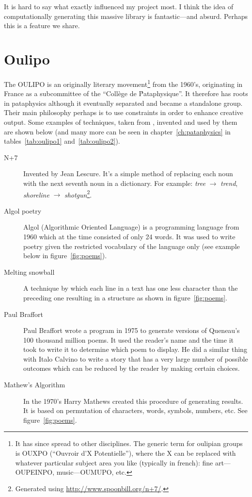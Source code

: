 It is hard to say what exactly influenced my project most. I think the idea of computationally generating this massive library is fantastic---and absurd. Perhaps this is a feature we share.


\section{Oulipo}
\label{s:oulipo}


The \ac{OULIPO} is an originally literary movement\footnote{It has since spread to other disciplines. The generic term for oulipian groups is OUXPO (``Ouvroir d'X Potentielle''), where the X can be replaced with whatever particular subject area you like (typically in french): fine art---OUPEINPO, music---OUMUPO, etc.} from the 1960's, originating in France as a subcommittee of the ``Coll\`{e}ge de \'Pataphysique''. It therefore has roots in pataphysics although it eventually separated and became a standalone group. Their main philosophy perhaps is to use constraints in order to enhance creative output. Some examples of techniques, taken from \autocite{Mathews2005}, invented and used by them are shown below (and many more can be seen in chapter~\ref{ch:pataphysics} in tables~\ref{tab:oulipo1} and~\ref{tab:oulipo2}).

\begin{description}
  \item[N+7] Invented by Jean Lescure. It's a simple method of replacing each noun with the next seventh noun in a dictionary. For example: \textit{tree} $\rightarrow$ \textit{trend}, \textit{shoreline} $\rightarrow$ \textit{shotgun}\footnote{Generated using \url{http://www.spoonbill.org/n+7/}.}.
  \item[Algol poetry] Algol (Algorithmic Oriented Language) is a programming language from 1960 which at the time consisted of only \num{24} words. It was used to write poetry given the restricted vocabulary of the language only (see example below in figure~\ref{fig:poems}).
  \item[Melting snowball] A technique by which each line in a text has one less character than the preceding one resulting in a structure as shown in figure~\ref{fig:poems}.
  \item[Paul Braffort] Paul Braffort wrote a program in 1975 to generate versions of Queneau's \num{100} thousand million poems. It used the reader's name and the time it took to write it to determine which poem to display. He did a similar thing with Italo Calvino to write a story that has a very large number of possible outcomes which can be reduced by the reader by making certain choices.
  \item[Mathew's Algorithm] In the 1970's Harry Mathews created this procedure of generating results. It is based on permutation of characters, words, symbols, numbers, etc. See figure~\ref{fig:poems}.
\end{description}

